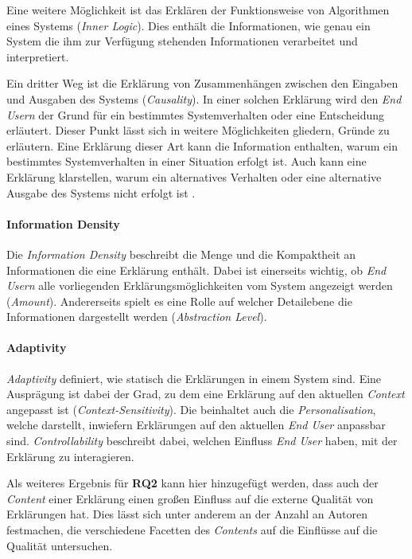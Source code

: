 Eine weitere Möglichkeit ist das Erklären der Funktionsweise von Algorithmen eines Systems (\textit{Inner Logic}). Dies enthält die Informationen, wie genau ein System die ihm zur Verfügung stehenden Informationen verarbeitet und interpretiert.

Ein dritter Weg ist die Erklärung von Zusammenhängen zwischen den Eingaben und Ausgaben des Systems (\textit{Causality}). In einer solchen Erklärung wird den \textit{End Usern} der Grund für ein bestimmtes Systemverhalten oder eine Entscheidung erläutert. Dieser Punkt lässt sich in weitere Möglichkeiten gliedern, Gründe zu erläutern. Eine Erklärung dieser Art kann die Information enthalten, warum ein bestimmtes Systemverhalten in einer Situation erfolgt ist. Auch kann eine Erklärung klarstellen, warum ein alternatives Verhalten oder eine alternative Ausgabe des Systems nicht erfolgt ist \cite{martin_evaluating_2021}.


\paragraph{Information Density} Die \textit{Information Density} beschreibt die Menge und die Kompaktheit an Informationen die eine Erklärung enthält. Dabei ist einerseits wichtig, ob \textit{End Usern} alle vorliegenden Erklärungsmöglichkeiten vom System angezeigt werden (\textit{Amount}). Andererseits spielt es eine Rolle auf welcher Detailebene die Informationen dargestellt werden (\textit{Abstraction Level}).

\paragraph{Adaptivity} \textit{Adaptivity} definiert, wie statisch die Erklärungen in einem System sind. Eine Ausprägung ist dabei der Grad, zu dem eine Erklärung auf den aktuellen \textit{Context} angepasst ist (\textit{Context-Sensitivity}). Die beinhaltet auch die \textit{Personalisation}, welche darstellt, inwiefern Erklärungen auf den aktuellen \textit{End User} anpassbar sind. \textit{Controllability} beschreibt dabei, welchen Einfluss \textit{End User} haben, mit der Erklärung zu interagieren.

\bigskip

Als weiteres Ergebnis für \textbf{RQ2} kann hier hinzugefügt werden, dass auch der \textit{Content} einer Erklärung einen großen Einfluss auf die externe Qualität von Erklärungen hat. Dies lässt sich unter anderem an der Anzahl an Autoren festmachen, die verschiedene Facetten des \textit{Contents} auf die Einflüsse auf die Qualität untersuchen.

